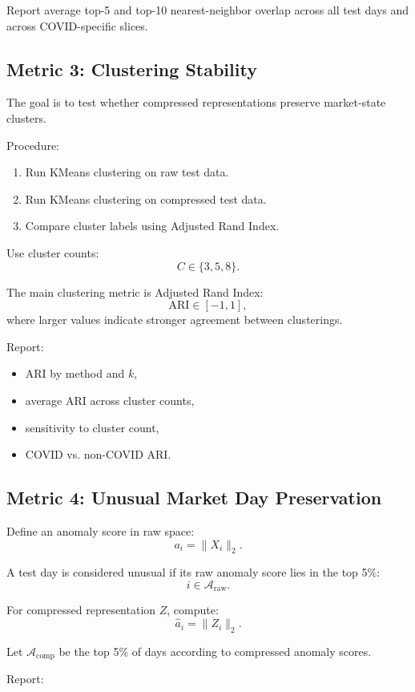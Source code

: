 \documentclass[11pt]{article}
\begin{document}
Report average top-5 and top-10 nearest-neighbor overlap across all test days and across COVID-specific slices.

\subsection{Metric 3: Clustering Stability}

The goal is to test whether compressed representations preserve market-state clusters.

Procedure:

\begin{enumerate}
    \item Run KMeans clustering on raw test data.
    \item Run KMeans clustering on compressed test data.
    \item Compare cluster labels using Adjusted Rand Index.
\end{enumerate}

Use cluster counts:
\[
C \in \{3, 5, 8\}.
\]

The main clustering metric is Adjusted Rand Index:
\[
\text{ARI} \in [-1, 1],
\]
where larger values indicate stronger agreement between clusterings.

Report:

\begin{itemize}
    \item ARI by method and $k$,
    \item average ARI across cluster counts,
    \item sensitivity to cluster count,
    \item COVID vs. non-COVID ARI.
\end{itemize}

\subsection{Metric 4: Unusual Market Day Preservation}

Define an anomaly score in raw space:
\[
a_i = \|X_i\|_2.
\]

A test day is considered unusual if its raw anomaly score lies in the top 5\%:
\[
i \in \mathcal{A}_{\text{raw}}.
\]

For compressed representation $Z$, compute:
\[
\hat{a}_i = \|Z_i\|_2.
\]

Let $\mathcal{A}_{\text{comp}}$ be the top 5\% of days according to compressed anomaly scores.

Report:
\end{document}
